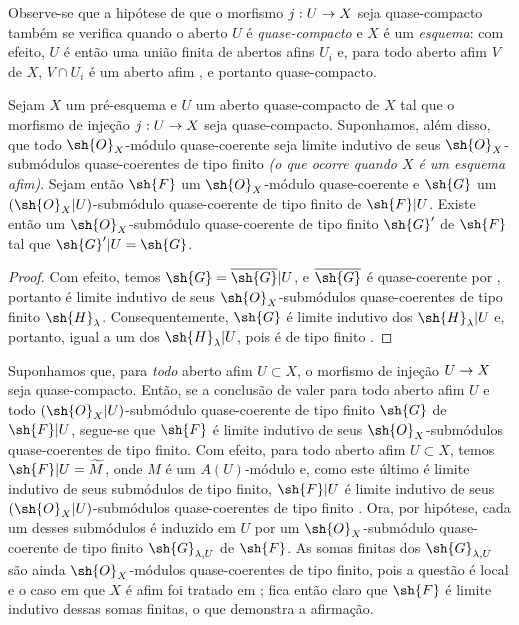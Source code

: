 \documentclass[oneside]{amsart}
\makeatletter
\newcommand{\ega@arrow}[2]{\mathchoice{#1}{#2}{#2}{#2}}
\renewcommand{\to}{\ega@arrow{\longrightarrow}{\rightarrow}}
\newcommand{\oldpage}[2][]{{\marginnote{\normalfont\textbf{#1}~|~#2}}\ignorespaces}
\let\EGAOriginalLabel\label
\renewcommand{\label}[1]{\phantomsection\EGAOriginalLabel{#1}}
\makeatother
\begin{document}
Observe-se que a hipótese de que o morfismo $j:U\to X$ seja quase-compacto também se
verifica quando o aberto $U$ é \emph{quase-compacto} e $X$ é um \emph{esquema}: com
efeito, $U$ é então uma união finita de abertos afins $U_i$ e, para todo aberto
afim $V$ de $X$, $V\cap U_i$ é um aberto afim , e portanto
quase-compacto.

\begin{corollary}[9.4.3]
\label{I.9.4.3}
Sejam $X$ um pré-esquema e $U$ um aberto quase-compacto de $X$ tal que o morfismo de
injeção $j:U\to X$ seja quase-compacto. Suponhamos, além disso, que todo
$\sh{O}_X$-módulo quase-coerente seja limite indutivo de seus $\sh{O}_X$-submódulos
quase-coerentes de tipo finito \emph{(o que ocorre quando $X$ é um
\emph{esquema afim})}. Sejam então $\sh{F}$ um $\sh{O}_X$-módulo quase-coerente e
$\sh{G}$ um $(\sh{O}_X|U)$-submódulo quase-coerente de tipo finito de $\sh{F}|U$.
Existe então um $\sh{O}_X$-submódulo quase-coerente de tipo finito $\sh{G}'$ de
$\sh{F}$ tal que $\sh{G}'|U=\sh{G}$.
\end{corollary}

\begin{proof}
Com efeito, temos $\sh{G}=\overline{\sh{G}}|U$, e $\overline{\sh{G}}$ é quase-coerente
por , portanto é limite indutivo de seus $\sh{O}_X$-submódulos
quase-coerentes de tipo finito $\sh{H}_\lambda$. Consequentemente, $\sh{G}$ é limite
indutivo dos $\sh{H}_\lambda|U$ e, portanto, igual a um dos $\sh{H}_\lambda|U$, pois é
de tipo finito .
\end{proof}

\begin{remark}[9.4.4]
\label{I.9.4.4}
Suponhamos que, para \emph{todo} aberto afim $U\subset X$, o morfismo de injeção
$U\to X$ seja quase-compacto. Então, se a conclusão de  valer para todo
aberto afim $U$ e todo $(\sh{O}_X|U)$-submódulo quase-coerente de tipo finito
$\sh{G}$ de $\sh{F}|U$,
\oldpage[I]{175}
segue-se que $\sh{F}$ é limite indutivo de seus $\sh{O}_X$-submódulos quase-coerentes
de tipo finito. Com efeito, para todo aberto afim $U\subset X$, temos
$\sh{F}|U=\widetilde{M}$, onde $M$ é um $A(U)$-módulo e, como este último é limite
indutivo de seus submódulos de tipo finito, $\sh{F}|U$ é limite indutivo de seus
$(\sh{O}_X|U)$-submódulos quase-coerentes de tipo finito . Ora, por
hipótese, cada um desses submódulos é induzido em $U$ por um $\sh{O}_X$-submódulo
quase-coerente de tipo finito $\sh{G}_{\lambda,U}$ de $\sh{F}$. As somas finitas dos
$\sh{G}_{\lambda,U}$ são ainda $\sh{O}_X$-módulos quase-coerentes de tipo finito, pois
a questão é local e o caso em que $X$ é afim foi tratado em ; fica
então claro que $\sh{F}$ é limite indutivo dessas somas finitas, o que demonstra a
afirmação.
\end{remark}
\end{document}
